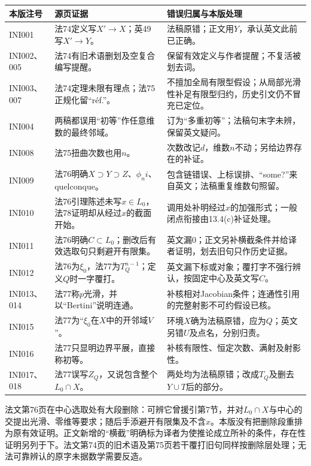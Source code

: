 \documentclass[UTF8,a4paper]{ctexbook}
\begin{document}
\begin{longtable}{@{}p{.17\linewidth}p{.35\linewidth}p{.39\linewidth}@{}}
\toprule
本版注号 & 源页证据 & 错误归属与本版处理\\
\midrule
\endhead
INI001 & 法74定义写$X'\to X$；英49写$X'\to Y$。 & 法稿原错；正文用$Y$，承认英文此前已正确。\\
INI002、005 & 法74有旧术语删划及空复合编写提醒。 & 保留有效定义与作者提醒；不复活被划去词。\\
INI003、007 & 法74定理未限有理点；法75正规化留“r\'ef.”。 & 不擅加全局有限型假设；从局部光滑性补足有限型归约，历史引文仍不冒充已定位。\\
INI004 & 两稿都误用“初等”作任意维数的最终邻域。 & 订为“多重初等”；法稿句末字未辨，保留英文疑问。\\
INI008 & 法75扭曲次数也用$n$。 & 次数改记$d$，维数$n$不动；另给边界存在的补证。\\
INI009 & 法76明确$X\supset Y\supset Z$、$\phi_n i$、quelconque。 & 包含链错误、上标误排、“some?”来自英文；法稿重复维数句照留。\\
INI010 & 法76引理陈述未写$x\in L_0$，法78证明却从经过$x$的截面开始。 & 调用处补明经过$x$的加强形式；一般闭点衔接由13.4(c)补证处理。\\
INI011 & 法76明确$C\subset L_0$；删改后有效选取句只剩避开有限集。 & 英文漏0；正文另补横截条件并给译者证明，划去旧句只作历史证据。\\
INI012 & 法76为$\xi_0$，法77为$T_Q^{n-1}$；定义$Q$时一字覆打。 & 英文漏下标或对象；覆打字不强行辨认，按固定中心及英文写$C$。\\
INI013、014 & 法77称$p$光滑，并以“Bertini”说明连通。 & 补核相对Jacobian条件；连通性引用的完整射影不可约假设已核。\\
INI015 & 法77为“$\xi_0$在$X$中的开邻域$V$”。 & 环境$X$确为法稿原错，应为$Q$；英文另错$U$及点名，分别归责。\\
INI016 & 法77只显明边界平展，直接称初等。 & 补核有限性、恒定次数、满射及射影性。\\
INI017、018 & 法77误写$Z_Q$，又说包含整个$L_0\cap X$。 & 两处均为法稿原错；改成$T_Q$及删去$Y\cup T$后的部分。\\
\bottomrule
\end{longtable}

法文第76页在中心选取处有大段删除：可辨它曾援引第7节，并对$L_0\cap X$与中心的交提出光滑、零维等要求；随后手添避开有限集及不含$x$。本版没有把删除段重排为原有效证明。正文新增的“横截”明确标为译者为使推论成立所补的条件，存在性证明另列于下。法文第74页的旧术语及第75页若干覆打旧句同样按删除层处理；无法可靠辨认的原字未据数学需要反造。
\end{document}
